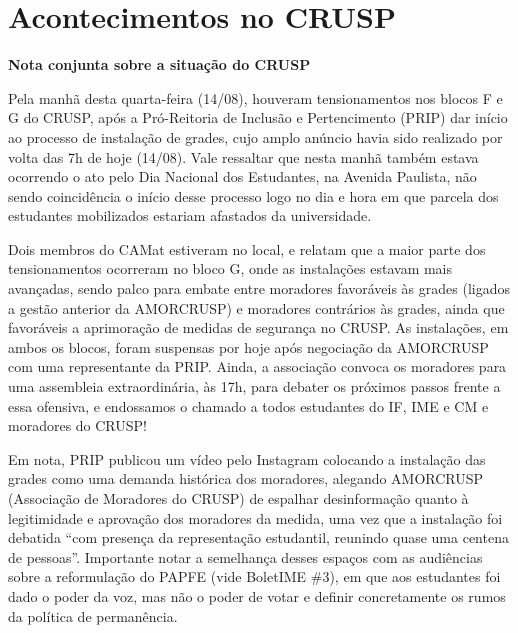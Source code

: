 \section*{Acontecimentos no CRUSP}
{\color{vermelho_camat} \textbf{Nota conjunta sobre a situação do CRUSP}}


Pela manhã desta quarta-feira (14/08), houveram tensionamentos nos blocos F e G do CRUSP, após a Pró-Reitoria de Inclusão e Pertencimento (PRIP) dar início ao processo de instalação de grades, cujo amplo anúncio havia sido realizado por volta das 7h de hoje (14/08). Vale ressaltar que nesta manhã também estava ocorrendo o ato pelo Dia Nacional dos Estudantes, na Avenida Paulista, não sendo coincidência o início desse processo logo no dia e hora em que parcela dos estudantes mobilizados estariam afastados da universidade.

Dois membros do CAMat estiveram no local, e relatam que a maior parte dos tensionamentos ocorreram no bloco G, onde as instalações estavam mais avançadas, sendo palco para embate entre moradores favoráveis às grades (ligados a gestão anterior da AMORCRUSP) e moradores contrários às grades, ainda que favoráveis a aprimoração de medidas de segurança no CRUSP. As instalações, em ambos os blocos, foram suspensas por hoje após negociação da AMORCRUSP com uma representante da PRIP. Ainda, a associação convoca os moradores para uma assembleia extraordinária, às 17h, para debater os próximos passos frente a essa ofensiva, e endossamos o chamado a todos estudantes do IF, IME e CM e moradores do CRUSP!

Em nota, PRIP publicou um vídeo pelo Instagram colocando a instalação das grades como uma demanda histórica dos moradores, alegando AMORCRUSP (Associação de Moradores do CRUSP) de espalhar desinformação quanto à legitimidade e aprovação dos moradores da medida, uma vez que a instalação foi debatida “com presença da representação estudantil, reunindo quase uma centena de pessoas”. Importante notar a semelhança desses espaços com as audiências sobre a reformulação do PAPFE (vide BoletIME \#3), em que aos estudantes foi dado o poder da voz, mas não o poder de votar e definir concretamente os rumos da política de permanência.

